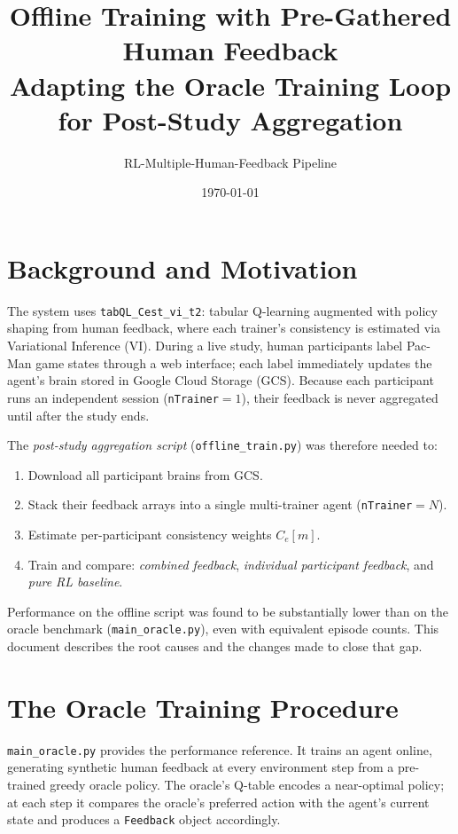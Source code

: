 \documentclass[11pt, a4paper]{article}
\title{\textbf{Offline Training with Pre-Gathered Human Feedback}\\
  \large Adapting the Oracle Training Loop for Post-Study Aggregation}
\author{RL-Multiple-Human-Feedback Pipeline}
\date{\today}
\begin{document}
\maketitle
\tableofcontents
\newpage

\section{Background and Motivation}
\label{sec:background}

The system uses \texttt{tabQL\_Cest\_vi\_t2}: tabular Q-learning augmented with
policy shaping from human feedback, where each trainer's consistency is
estimated via Variational Inference (VI).  During a live study, human
participants label Pac-Man game states through a web interface; each label
immediately updates the agent's brain stored in Google Cloud Storage (GCS).
Because each participant runs an independent session (\texttt{nTrainer}$=1$),
their feedback is never aggregated until after the study ends.

The \emph{post-study aggregation script} (\texttt{offline\_train.py}) was
therefore needed to:
\begin{enumerate}
  \item Download all participant brains from GCS.
  \item Stack their feedback arrays into a single multi-trainer agent
        (\texttt{nTrainer}$=N$).
  \item Estimate per-participant consistency weights $C_e[m]$.
  \item Train and compare: \emph{combined feedback}, \emph{individual
        participant feedback}, and \emph{pure RL baseline}.
\end{enumerate}

Performance on the offline script was found to be substantially lower than
on the oracle benchmark (\texttt{main\_oracle.py}), even with equivalent
episode counts.  This document describes the root causes and the changes made
to close that gap.

\section{The Oracle Training Procedure}
\label{sec:oracle}

\texttt{main\_oracle.py} provides the performance reference.  It trains an
agent online, generating synthetic human feedback at every environment step
from a pre-trained greedy oracle policy.  The oracle's Q-table encodes a
near-optimal policy; at each step it compares the oracle's preferred action
with the agent's current state and produces a \texttt{Feedback} object
accordingly.
\end{document}

